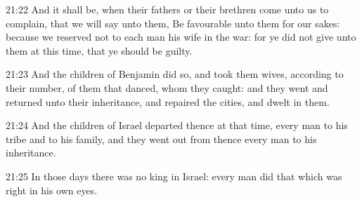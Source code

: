 21:22 And it shall be, when their fathers or their brethren come unto
us to complain, that we will say unto them, Be favourable unto them
for our sakes: because we reserved not to each man his wife in the
war: for ye did not give unto them at this time, that ye should be
guilty.

21:23 And the children of Benjamin did so, and took them wives,
according to their number, of them that danced, whom they caught: and
they went and returned unto their inheritance, and repaired the
cities, and dwelt in them.

21:24 And the children of Israel departed thence at that time, every
man to his tribe and to his family, and they went out from thence
every man to his inheritance.

21:25 In those days there was no king in Israel: every man did that
which was right in his own eyes.

